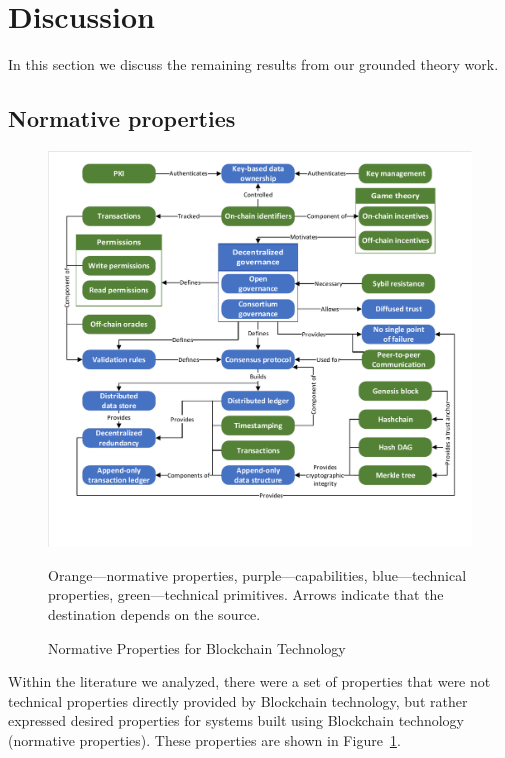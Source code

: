 
\section{Discussion}
In this section we discuss the remaining results from our grounded theory work.


\subsection{Normative properties}
\label{sec:normative}

\begin{figure}
	\centering
	\includegraphics[page=3,width=\columnwidth]{figures/grounded-theory-main}
	
	{\small Orange---normative properties, purple---capabilities, blue---technical properties, green---technical primitives. Arrows indicate that the destination depends on the source.}
	\caption{Normative Properties for Blockchain Technology}
	\label{fig:normative-properties}
\end{figure}

Within the literature we analyzed, there were a set of properties that were not technical properties directly provided by Blockchain technology, but rather expressed desired properties for systems built using Blockchain technology (\ie normative properties).
These properties are shown in Figure~\ref{fig:normative-properties}.

